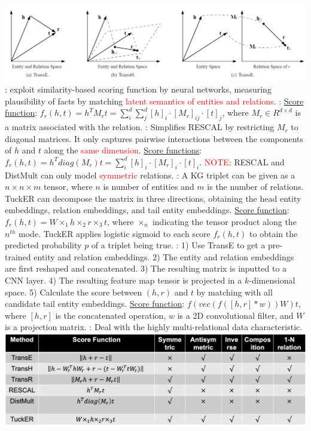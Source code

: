 \includegraphics[height=0.05\textwidth]{figs/TransEHR.png}
: exploit similarity-based scoring function by neural networks, measuring plausibility of facts by matching \textcolor{red}{latent semantics of entities and relations}.
: \underline{Score function}: $f_r(h,t)=h^T M_r t = \sum^d_i \sum^d_j [h]_i \cdot [M_r]_{ij} \cdot [t]_j$, where $M_r \in R^{d \times d}$ is a matrix associated with the relation.
: Simplifies RESCAL by restricting $M_r$ to diagonal matrices. It only captures pairwise interactions between the components of $h$ and $t$ along the \textcolor{red}{same dimension}. \underline{Score functions}: $f_r(h,t)= h^T diag(M_r) t = \sum^d_i [h]_i \cdot [M_r]_i \cdot [t]_i$.
\textcolor{red}{NOTE}: RESCAL and DistMult can only model \textcolor{red}{symmetric} relations.
: A KG triplet can be given as a $n\times n \times m$ tensor, where $n$ is number of entities and $m$ is the number of relations. TuckER can decompose the matrix in three directions, obtaining the head entity embeddings, relation embeddings, and tail entity embeddings. \underline{Score function}: $f_r(h,t) = W \times_1 h \times_2 r \times_3 t$, where $\times_n$ indicating the tensor product along the $n^{th}$ mode. TuckER applies logistic sigmoid to each score $f_r(h,t)$ to obtain the predicted probability $p$ of a triplet being true.
: 1) Use TransE to get a pre-trained entity and relation embeddings. 2) The entity and relation embeddings are first reshaped and concatenated. 3) The resulting matrix is inputted to a CNN layer. 4) The resulting feature map tensor is projected in a $k$-dimensional space. 5) Calculate the score between $(h, r)$ and $t$ by matching with all candidate tail entity embeddings. \underline{Score function}: $f(vec(f([h,r] * w))W)t$, where $[h,r]$ is the concatenated operation, $w$ is a 2D convolutional filter, and $W$ is a projection matrix.
: Deal with the highly multi-relational data characteristic.
\includegraphics[height=0.06\textwidth]{figs/KGCompare.png}
